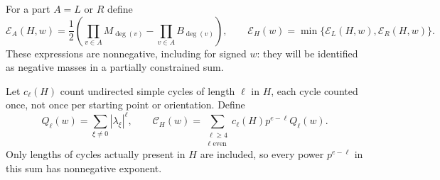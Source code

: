 \documentclass[11pt]{article}
\numberwithin{equation}{section}
\theoremstyle{definition}
\theoremstyle{remark}
\newcommand{\Err}{\mathcal E}
\begin{document}
For a part $A=L$ or $R$ define
\begin{equation}
 \Err_A(H,w)=\frac12\left(
   \prod_{v\in A}M_{\deg(v)}-
   \prod_{v\in A}B_{\deg(v)}\right),
 \qquad
 \Err_H(w)=\min\{\Err_L(H,w),\Err_R(H,w)\}.
 \label{eq:error}
\end{equation}
These expressions are nonnegative, including for signed $w$: they will
be identified as negative masses in a partially constrained sum.

Let $c_\ell(H)$ count undirected simple cycles of length $\ell$ in $H$,
each cycle counted once, not once per starting point or orientation.
Define
\begin{equation}
 Q_\ell(w)=\sum_{\xi\ne0}|\lambda_\xi|^\ell,
 \qquad
 \mathcal C_H(w)=\sum_{\substack{\ell\geq4\\\ell\text{ even}}}
       c_\ell(H)p^{e-\ell}Q_\ell(w).
 \label{eq:inventory}
\end{equation}
Only lengths of cycles actually present in $H$ are included, so every
power $p^{e-\ell}$ in this sum has nonnegative exponent.
\end{document}
